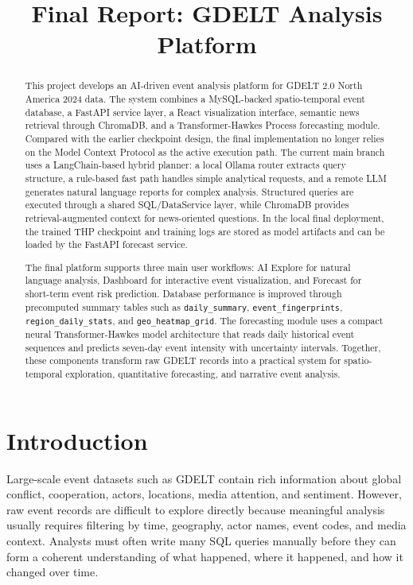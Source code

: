 \documentclass[11pt]{article}
\title{\textbf{Final Report: GDELT Analysis Platform}}
\author{}
\date{}
\begin{document}
\maketitle

\begin{abstract}
This project develops an AI-driven event analysis platform for GDELT 2.0 North America 2024 data. The system combines a MySQL-backed spatio-temporal event database, a FastAPI service layer, a React visualization interface, semantic news retrieval through ChromaDB, and a Transformer-Hawkes Process forecasting module. Compared with the earlier checkpoint design, the final implementation no longer relies on the Model Context Protocol as the active execution path. The current main branch uses a LangChain-based hybrid planner: a local Ollama router extracts query structure, a rule-based fast path handles simple analytical requests, and a remote LLM generates natural language reports for complex analysis. Structured queries are executed through a shared SQL/DataService layer, while ChromaDB provides retrieval-augmented context for news-oriented questions. In the local final deployment, the trained THP checkpoint and training logs are stored as model artifacts and can be loaded by the FastAPI forecast service.

The final platform supports three main user workflows: AI Explore for natural language analysis, Dashboard for interactive event visualization, and Forecast for short-term event risk prediction. Database performance is improved through precomputed summary tables such as \texttt{daily\_summary}, \texttt{event\_fingerprints}, \texttt{region\_daily\_stats}, and \texttt{geo\_heatmap\_grid}. The forecasting module uses a compact neural Transformer-Hawkes model architecture that reads daily historical event sequences and predicts seven-day event intensity with uncertainty intervals. Together, these components transform raw GDELT records into a practical system for spatio-temporal exploration, quantitative forecasting, and narrative event analysis.
\end{abstract}

\section{Introduction}

Large-scale event datasets such as GDELT contain rich information about global conflict, cooperation, actors, locations, media attention, and sentiment. However, raw event records are difficult to explore directly because meaningful analysis usually requires filtering by time, geography, actor names, event codes, and media context. Analysts must often write many SQL queries manually before they can form a coherent understanding of what happened, where it happened, and how it changed over time.
\end{document}
